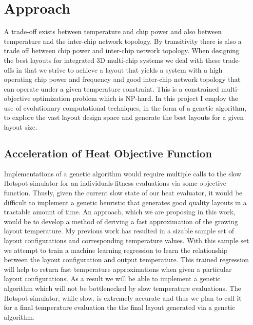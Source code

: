 \iffalse
Designing the best integrated 3D multi-chip system which optimizes temperature,
chip frequencies, and inter-chip network topology is an NP-hard multi-objective
optimization problem.  The use of heuristics to solves this problem is
necessary to arrive at good layout geometries in a tractable amount of time.
The Hotspot v6.0 heat simulator was used in previous work to accurately measure
the operating temperature of the integrated 3D multi-chip system however, it is
a computationally expensive and a lengthy process.  Thusly, Hotspot's lengthy runtime
limited the heuristics we were able to employ for exploring different layout
geometries.  
\fi

\section{Approach}

A trade-off exists between temperature and chip power and also between
temperature and the inter-chip network topology.  By transitivity there is also
a trade off between chip power and inter-chip network topology.  When designing
the best layouts for integrated 3D multi-chip systems we deal with these
trade-offs in that we strive to achieve a layout that yields a system with a
high operating chip power and frequency and good inter-chip network topology that
can operate under a given temperature constraint.  This is a constrained
multi-objective optimization problem which is NP-hard.  In this project I employ
the use of evolutionary computational techniques, in the form of a genetic
algorithm, to explore the vast layout design space and generate the best
layouts for a given layout size.

\subsection{Acceleration of Heat Objective Function}
Implementations of a genetic algorithm would require multiple calls to the slow
Hotspot simulator for an individuals fitness evaluations via some objective
function. Thusly, given the current slow state of our heat evaluator, it would
be difficult to implement a genetic heuristic that generates good quality
layouts in a tractable amount of time.  An approach, which we are proposing in
this work, would be to develop a method of deriving a fast approximation of the growing
layout temperature.  My previous work has resulted in a sizable sample set of
layout configurations and corresponding temperature values.  With this sample
set we attempt to train a machine learning regression to learn the relationship
between the layout configuration and output temperature.  This trained
regression will help to return fast temperature approximations when given a
particular layout configurations.  As a result we will be able to implement a
genetic algorithm which will not be bottlenecked by slow temperature
evaluations.  The Hotspot simulator, while slow, is extremely accurate and thus
we plan to call it for a final temperature evaluation the the final layout
generated via a genetic algorithm.  

